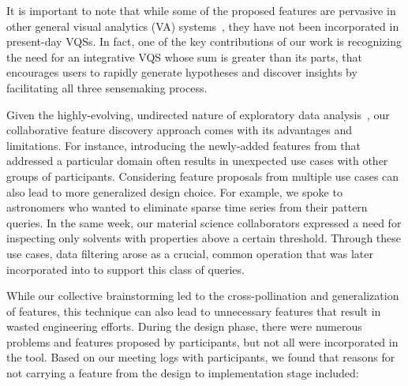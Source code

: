 {  %
  \par It is important to note that while some of the proposed features are pervasive in other general visual analytics (VA) systems~\cite{Heer2012,Amar2005}, they have not been incorporated in present-day VQSs. In fact, one of the key contributions of our work is recognizing the need for an integrative VQS whose sum is greater than its parts, that encourages users to rapidly generate hypotheses and discover insights by facilitating all three sensemaking process.
  \par Given the highly-evolving, undirected nature of exploratory data analysis~\cite{Keim2006,Tukey1970}, our collaborative feature discovery approach comes with its advantages and limitations. For instance, introducing the newly-added features from \zvpp that addressed a particular domain often results in unexpected use cases with other groups of participants. Considering feature proposals  \noindent from multiple use cases can also lead to more generalized design choice. For example, we spoke to astronomers who wanted to eliminate sparse time series from their pattern queries. In the same week, our material science collaborators expressed a need for inspecting only solvents with properties above a certain threshold. Through these use cases, data filtering arose as a crucial, common operation that was later incorporated into \zvpp to support this class of queries. %
  \par While our collective brainstorming led to the cross-pollination and generalization of features, this technique can also lead to unnecessary features that result in wasted engineering efforts. During the design phase, there were numerous problems and features proposed by participants, but not all were incorporated in the tool. Based on our meeting logs with participants, we found that reasons for not carrying a feature from the design to implementation stage included:
}
